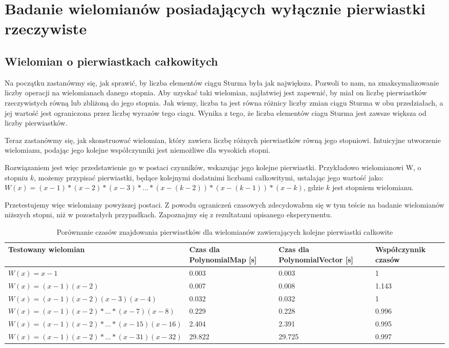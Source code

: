 \section{Badanie wielomianów posiadających wyłącznie pierwiastki rzeczywiste}

\subsection{Wielomian o pierwiastkach całkowitych}

Na początku zastanówmy się, jak sprawić, by liczba elementów ciągu Sturma była jak największa. Pozwoli to nam, na zmaksymalizowanie liczby operacji na wielomianach danego stopnia. Aby uzyskać taki wielomian, najłatwiej jest zapewnić, by miał on liczbę pierwiastków rzeczywistych równą lub zbliżoną do jego stopnia. Jak wiemy, liczba ta jest równa różnicy liczby zmian ciągu Sturma w obu przedziałach, a jej wartość jest ograniczona przez liczbę wyrazów tego ciagu. Wynika z tego, że liczba elementów ciagu Sturma jest zawsze większa od liczby pierwiastków.

Teraz zastanówmy się, jak skonstruować wielomian, który zawiera liczbę różnych pierwiastków równą jego stopniowi. Intuicyjne utworzenie wielomianu, podając jego kolejne współczynniki jest niemożliwe dla wysokich stopni.

Rozwiązaniem jest więc przedstawienie go w postaci czynników, wskazując jego kolejne pierwiastki. Przykładowo wielomianowi W, o stopniu $k$, możemy przypisać pierwiastki, będące kolejnymi dodatnimi liczbami całkowitymi, ustalając jego wartość jako: \\ $W(x)=(x-1)*(x-2)*(x-3)*...*(x-(k-2))*(x-(k-1))*(x-k)$, gdzie $k$ jest stopniem wielomianu.

Przetestujemy więc wielomiany powyższej postaci. Z powodu ograniczeń czasowych zdecydowałem się w tym teście na badanie wielomianów niższych stopni, niż w pozostałych przypadkach. Zapoznajmy się z rezultatami opisanego eksperymentu.

\begin{table}
	\begin{tabular}{ |p{4cm}|p{2.75cm}|p{2.75cm}|p{3.5cm}|} 
		\hline
		Testowany wielomian & Czas dla PolynomialMap [s] & Czas dla PolynomialVector [s] & Współczynnik czasów \\
		\hline
		$W(x) = x-1$ & 0.003 & 0.003 & 1 \\
		$W(x) = (x-1)(x-2)$ & 0.007 & 0.008 & 1.143 \\
		$W(x) = (x-1)(x-2)(x-3)(x-4)$ & 0.032 & 0.032 & 1 \\
		$W(x) = (x-1)(x-2)*...*(x-7)(x-8)$ & 0.229 & 0.228 & 0.996 \\
		$W(x) = (x-1)(x-2)*...*(x-15)(x-16)$ & 2.404 & 2.391 & 0.995 \\
		$W(x) = (x-1)(x-2)*...*(x-31)(x-32)$ & 29.822 & 29.725 & 0.997 \\
		\hline
	\end{tabular}
	\caption{Porównanie czasów znajdowania pierwiastków dla wielomianów zawierających kolejne pierwiastki całkowite}
\end{table}

